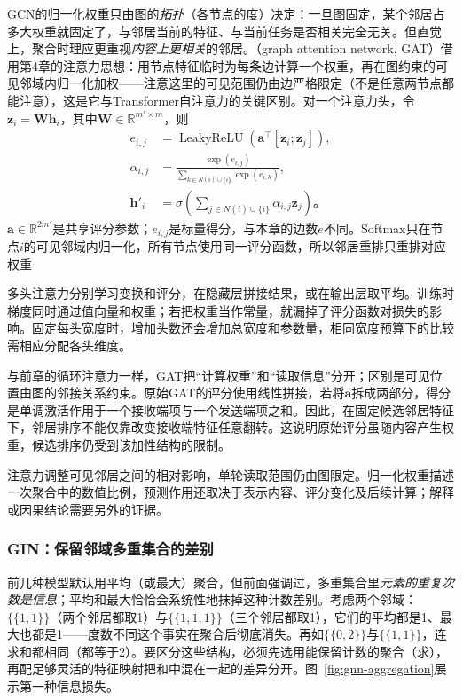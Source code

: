 GCN的归一化权重只由图的\emph{拓扑}（各节点的度）决定：一旦图固定，某个邻居占多大权重就固定了，与邻居当前的特征、与当前任务是否相关完全无关。但直觉上，聚合时理应更重视\emph{内容上更相关}的邻居。（graph attention network, GAT）借用第4章的注意力思想：用节点特征临时为每条边计算一个权重，再在图约束的可见邻域内归一化加权——注意这里的可见范围仍由边严格限定（不是任意两节点都能注意），这是它与Transformer自注意力的关键区别。对一个注意力头，令$\bm{z}_i=\bm{W}\bm{h}_i$，其中$\bm{W}\in\mathbb{R}^{m'\times m}$，则
\begin{equation}
  \begin{aligned}
    e_{i,j}&=\operatorname{LeakyReLU}
      \!\left(\bm{a}^{\top}[\bm{z}_i;\bm{z}_j]\right),\\
    \alpha_{i,j}&=\frac{\exp(e_{i,j})}
      {\sum_{k\in N(i)\cup\{i\}}\exp(e_{i,k})},\\
    \bm{h}'_i&=\sigma\!\left(\sum_{j\in N(i)\cup\{i\}}
      \alpha_{i,j}\bm{z}_j\right)\text{。}
  \end{aligned}
  \label{eq:gnn-gat}
\end{equation}
$\bm{a}\in\mathbb{R}^{2m'}$是共享评分参数；$e_{i,j}$是标量得分，与本章的边数$e$不同。Softmax只在节点$i$的可见邻域内归一化，所有节点使用同一评分函数，所以邻居重排只重排对应权重

多头注意力分别学习变换和评分，在隐藏层拼接结果，或在输出层取平均。训练时梯度同时通过值向量和权重；若把权重当作常量，就漏掉了评分函数对损失的影响。固定每头宽度时，增加头数还会增加总宽度和参数量，相同宽度预算下的比较需相应分配各头维度。

与前章的循环注意力一样，GAT把“计算权重”和“读取信息”分开；区别是可见位置由图的邻接关系约束。原始GAT的评分使用线性拼接，若将$\bm{a}$拆成两部分，得分是单调激活作用于一个接收端项与一个发送端项之和。因此，在固定候选邻居特征下，邻居排序不能仅靠改变接收端特征任意翻转。这说明原始评分虽随内容产生权重，候选排序仍受到该加性结构的限制。

注意力调整可见邻居之间的相对影响，单轮读取范围仍由图限定。归一化权重描述一次聚合中的数值比例，预测作用还取决于表示内容、评分变化及后续计算；解释或因果结论需要另外的证据。

\subsubsection{GIN：保留邻域多重集合的差别}
\label{sec:gnn-gin}

前几种模型默认用平均（或最大）聚合，但前面强调过，多重集合里\emph{元素的重复次数是信息}；平均和最大恰恰会系统性地抹掉这种计数差别。考虑两个邻域：$\{\!\{1,1\}\!\}$（两个邻居都取1）与$\{\!\{1,1,1\}\!\}$（三个邻居都取1），它们的平均都是1、最大也都是1——度数不同这个事实在聚合后彻底消失。再如$\{\!\{0,2\}\!\}$与$\{\!\{1,1\}\!\}$，连求和都相同（都等于2）。要区分这些结构，必须先选用能保留计数的聚合（求），再配足够灵活的特征映射把和中混在一起的差异分开。图~\ref{fig:gnn-aggregation}展示第一种信息损失。

